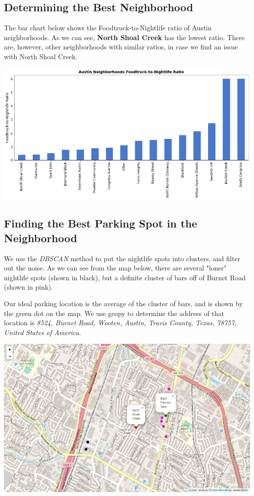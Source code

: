 \documentclass{deagle}
\begin{document}
\subsection*{Determining the Best Neighborhood}

The bar chart below shows the Foodtruck-to-Nightlife ratio of Austin neighborhoods. As we can see, \textbf{North Shoal Creek} has the lowest ratio. There are, however, other neighborhoods with similar ratios, in case we find an issue with North Shoal Creek.

\begin{center}
\includegraphics[scale=0.45]{bar}
\end{center}

\subsection*{Finding the Best Parking Spot in the Neighborhood}

We use the \emph{DBSCAN} method to put the nightlife spots into clusters, and filter out the noise. As we can see from the map below, there are several "loner" nightlife spots (shown in black), but a definite cluster of bars off of Burnet Road (shown in pink).

Our ideal parking location is the average of the cluster of bars, and is shown by the green dot on the map. We use geopy to determine the address of that location is \emph{8524, Burnet Road, Wooten, Austin, Travis County, Texas, 78757, United States of America}.

\begin{center}
    \includegraphics[scale=0.55]{map}
\end{center}
\end{document}
